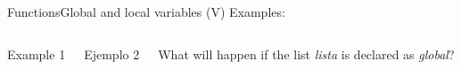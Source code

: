 \documentclass[10pt,compress]{beamer} %
\begin{document}
\begin{frame}{Functions}{Global and local variables (V)}
Examples:
    \begin{columns}
		\begin{block}{Example 1}
		\vspace{-0.2cm}
		
		
		\end{block}
		\vspace{0.8cm}

		\begin{block}{Ejemplo 2}
		\vspace{-0.2cm}
		
		\vspace{-0.2cm}
		\end{block}
		What will happen if the list \textit{lista} is declared as \textit{global}?
	\end{columns}

\end{frame}
\end{document}
